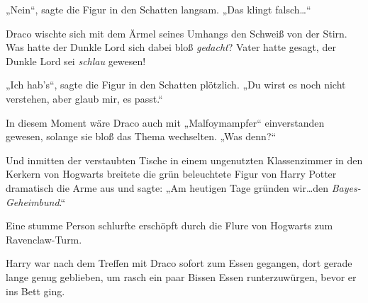 „Nein“, sagte die Figur in den Schatten langsam. „Das klingt falsch…“

Draco wischte sich mit dem Ärmel seines Umhangs den Schweiß von der Stirn. Was hatte der Dunkle Lord sich dabei bloß \emph{gedacht}? Vater hatte gesagt, der Dunkle Lord sei \emph{schlau} gewesen!

„Ich hab’s“, sagte die Figur in den Schatten plötzlich. „Du wirst es noch nicht verstehen, aber glaub mir, es passt.“

In diesem Moment wäre Draco auch mit „Malfoymampfer“ einverstanden gewesen, solange sie bloß das Thema wechselten. „Was denn?“

Und inmitten der verstaubten Tische in einem ungenutzten Klassenzimmer in den Kerkern von Hogwarts breitete die grün beleuchtete Figur von Harry Potter dramatisch die Arme aus und sagte: „Am heutigen Tage gründen wir…den \emph{Bayes-Geheimbund}.“

\later

Eine stumme Person schlurfte erschöpft durch die Flure von Hogwarts zum Ravenclaw-Turm.

Harry war nach dem Treffen mit Draco sofort zum Essen gegangen, dort gerade lange genug geblieben, um rasch ein paar Bissen Essen runterzuwürgen, bevor er ins Bett ging.

